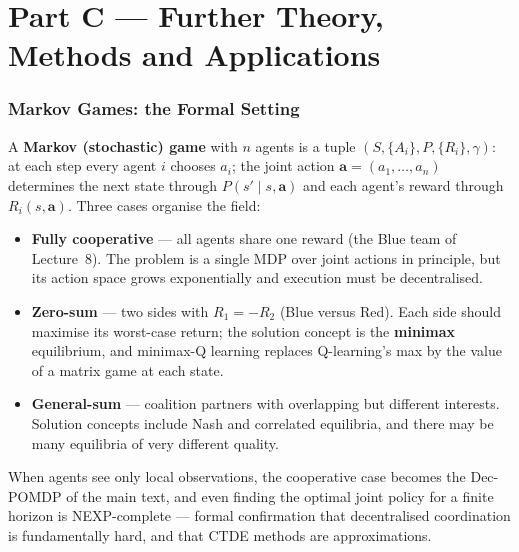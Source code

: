 \documentclass[11pt]{article}
\begin{document}
\clearpage
\part*{Part C --- Further Theory, Methods and Applications}

\section{Markov Games: the Formal Setting}
A \textbf{Markov (stochastic) game} with $n$ agents is a tuple $(S,\{A_i\},P,\{R_i\},\gamma)$: at each step every agent $i$ chooses $a_i$; the joint action $\mathbf a=(a_1,\ldots,a_n)$ determines the next state through $P(s'\mid s,\mathbf a)$ and each agent's reward through $R_i(s,\mathbf a)$. Three cases organise the field:
\begin{itemize}
\item \textbf{Fully cooperative} --- all agents share one reward (the Blue team of Lecture~8). The problem is a single MDP over joint actions in principle, but its action space grows exponentially and execution must be decentralised.
\item \textbf{Zero-sum} --- two sides with $R_1=-R_2$ (Blue versus Red). Each side should maximise its worst-case return; the solution concept is the \textbf{minimax} equilibrium, and minimax-Q learning replaces Q-learning's max by the value of a matrix game at each state.
\item \textbf{General-sum} --- coalition partners with overlapping but different interests. Solution concepts include Nash and correlated equilibria, and there may be many equilibria of very different quality.
\end{itemize}
When agents see only local observations, the cooperative case becomes the Dec-POMDP of the main text, and even finding the optimal joint policy for a finite horizon is NEXP-complete --- formal confirmation that decentralised coordination is fundamentally hard, and that CTDE methods are approximations.
\end{document}
